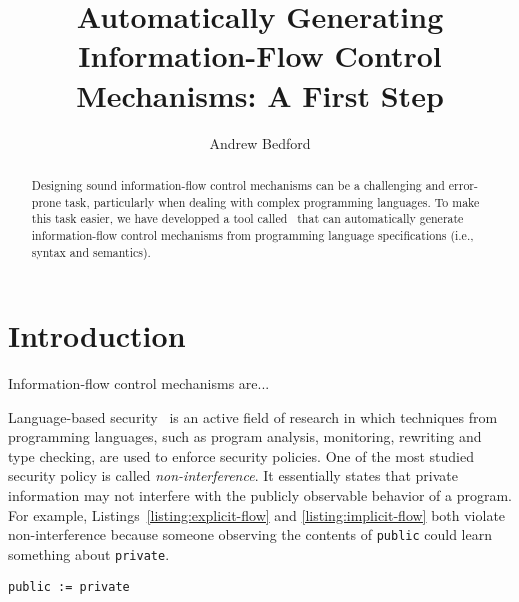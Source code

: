 \documentclass[sigplan,10pt]{acmart}\settopmatter{printfolios=true,printccs=false,printacmref=false}
\begin{document}
\title[ott-ifc]{Automatically Generating Information-Flow Control Mechanisms: A First Step}


\author{Andrew Bedford}


\begin{abstract}
Designing sound information-flow control mechanisms can be a challenging and error-prone task, particularly when dealing with complex programming languages. To make this task easier, we have developped a tool called \ottifc\ that can automatically generate information-flow control mechanisms from programming language specifications (i.e., syntax and semantics).
\end{abstract}

\maketitle

\section{Introduction}
Information-flow control mechanisms are... 

Language-based security~\cite{DBLP:conf/dagstuhl/SchneiderMH01} is an active field of research in which techniques from programming languages, such as program analysis, monitoring, rewriting and type checking, are used to enforce security policies. One of the most studied security policy is called \emph{non-interference}. It essentially states that private information may not interfere with the publicly observable behavior of a program. For example, Listings~\ref{listing:explicit-flow} and \ref{listing:implicit-flow} both violate non-interference because someone observing the contents of \lstinline{public} could learn something about \lstinline{private}.

\begin{lstlisting}[captionpos=b, caption=Insecure explicit flow, label=listing:explicit-flow]
  public := private
\end{lstlisting}
\end{document}
